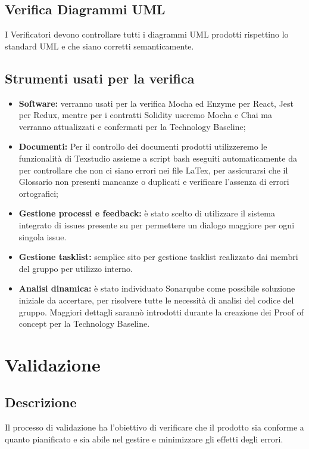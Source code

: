 \documentclass[NormeDiProgetto.tex]{subfiles}
\begin{document}
	\subsection{Verifica Diagrammi UML}
	I Verificatori devono controllare tutti i diagrammi UML prodotti rispettino lo standard UML e che siano corretti semanticamente.
	
	\subsection{Strumenti usati per la verifica}
	\begin{itemize}
		\item \textbf{Software:} verranno usati per la verifica Mocha ed Enzyme per React, Jest per Redux, mentre per i contratti Solidity useremo Mocha e Chai ma verranno attualizzati e confermati per la Technology Baseline;
		\item \textbf{Documenti:} Per il controllo dei documenti prodotti utilizzeremo le funzionalità di Texstudio assieme a script bash eseguiti automaticamente da  per controllare che non ci siano errori nei file LaTex, per assicurarsi che il Glossario non presenti mancanze o duplicati e verificare l'assenza di errori ortografici;
		\item \textbf{Gestione processi e feedback:} è stato scelto di utilizzare il sistema integrato di issues presente su  per permettere un dialogo maggiore per ogni singola issue. 
		\item \textbf{Gestione tasklist:}  semplice sito per gestione tasklist realizzato dai membri del gruppo per utilizzo interno.
		\item \textbf{Analisi dinamica:} è stato individuato Sonarqube come possibile soluzione iniziale da accertare, per risolvere tutte le necessità di analisi del codice del gruppo. Maggiori dettagli sarannò introdotti durante la creazione dei Proof of concept per la Technology Baseline.
	\end{itemize}


	\section{Validazione}
	\subsection{Descrizione}
		Il processo di validazione ha l'obiettivo di verificare che il prodotto sia conforme a quanto pianificato e sia abile nel gestire e minimizzare gli effetti degli errori.
\end{document}
